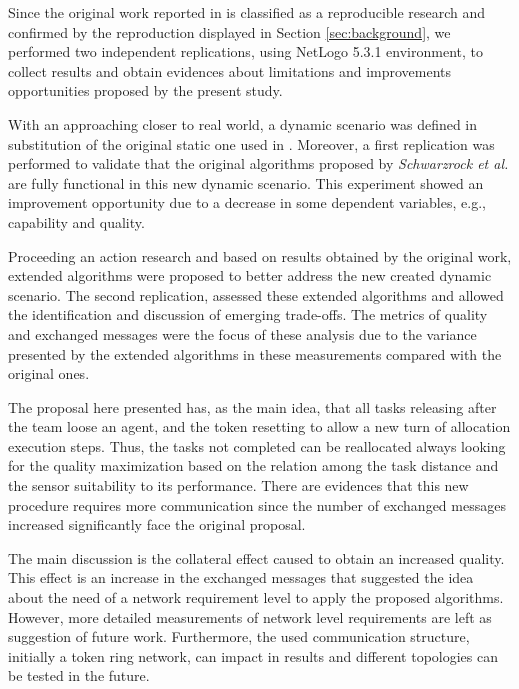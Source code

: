 Since the original work reported in \cite{MAS07} is classified as a reproducible research\cite{exp02} and confirmed by the reproduction displayed in Section \ref{sec:background}, we performed two independent replications, using NetLogo 5.3.1 environment, to collect results and obtain evidences about limitations and improvements opportunities proposed by the present study.

With an approaching closer to real world, a dynamic scenario was defined in substitution of the original static one used in \cite{MAS07}. Moreover, a first replication was performed to validate that the original algorithms proposed by \textit{Schwarzrock et al.} are fully functional in this new dynamic scenario. This experiment showed an improvement opportunity due to a decrease in some dependent variables, e.g., capability and quality. 

Proceeding an action research and based on results obtained by the original work, extended algorithms were proposed to better address the new created dynamic scenario. The second replication, assessed these extended algorithms and allowed the identification and discussion of emerging trade-offs. The metrics of quality and exchanged messages were the focus of these analysis due to the variance presented by the extended algorithms in these measurements compared with the original ones.

The proposal here presented has, as the main idea, that all tasks releasing after the team loose an agent, and the token resetting to allow a new turn of allocation execution steps. Thus, the tasks not completed can be reallocated always looking for the quality maximization based on the relation among the task distance and the sensor suitability to its performance. There are evidences that this new procedure requires more communication since the number of exchanged messages increased significantly face the original proposal.

The main discussion is the collateral effect caused to obtain an increased quality. This effect is an increase in the exchanged messages that suggested the idea about the need of a network requirement level to apply the proposed algorithms. However, more detailed measurements of network level requirements are left as suggestion of future work. Furthermore, the used communication structure, initially a token ring network, can impact in results and different topologies can be tested in the future.